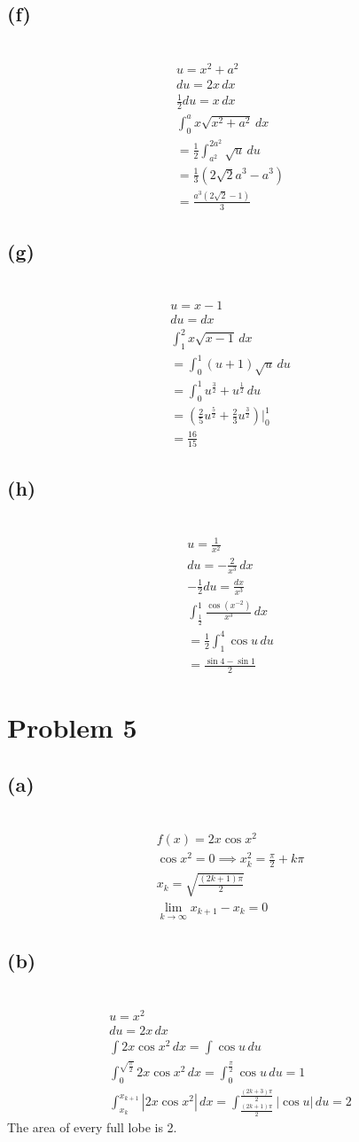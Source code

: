 \documentclass[12pt]{article}
\newcommand{\vem}{\vspace{0.5em}}
\newcommand{\problem}[1]{\section{Problem #1}}
\newcommand{\subproblem}[1]{\subsection{(#1)} \,}
\begin{document}
\subproblem{f}
\begin{gather*}
    u=x^2+a^2\\
    du=2x\, dx\\
    \frac{1}{2}du = x\, dx\\
    \int_0^a x\sqrt{x^2+a^2}\, dx\\
    =\frac{1}{2}\int_{a^2}^{2a^2} \sqrt{u}\, du\\
    =\frac{1}{3}(2\sqrt{2}a^3-a^3)\\
    =\boxed{\frac{a^3(2\sqrt{2}-1)}{3}}
\end{gather*}

\subproblem{g}
\begin{gather*}
    u=x-1\\
    du=dx\\
    \int_1^2x\sqrt{x-1}\, dx\\
    =\int_0^1 (u+1)\sqrt{u}\, du\\
    =\int_0^1 u^\frac{3}{2}+u^\frac{1}{2}\, du\\
    = (\frac{2}{5}u^\frac{5}{2}+ \frac{2}{3}u^\frac{3}{2})\Big|^1_0\\
    =\boxed{\frac{16}{15}}
\end{gather*}

\subproblem{h}
\begin{gather*}
    u=\frac{1}{x^2}\\
    du = -\frac{2}{x^3}\, dx\\
    -\frac{1}{2}du=\frac{dx}{x^3}\\
    \int_\frac{1}{2}^1\frac{\cos (x^{-2})}{x^3}\, dx\\
    =\frac{1}{2}\int_1^4 \cos u \, du\\
    =\boxed{\frac{\sin 4-\sin 1}{2}}
\end{gather*}

\problem{5}

\subproblem{a}
\begin{gather*}
    f(x)=2x\cos x^2\\
    \cos x^2=0 \implies x_k^2=\frac{\pi}{2}+k\pi\\
    x_k=\sqrt{\frac{(2k+1)\pi}{2}}\\
    \lim_{k\to \infty} x_{k+1}-x_k=0
\end{gather*}

\subproblem{b}
\begin{gather*}
    u=x^2\\
    du=2x \, dx\\
    \int 2x\cos x^2\, dx=\int \cos u\, du\\
    \int_0^{\sqrt{\frac{\pi}{2}}} 2x\cos x^2\, dx=\int_0^\frac{\pi}{2} \cos u\, du = 1\\
    \int_{x_k}^{x_{k+1}} |2x\cos x^2|\, dx = \int_{\frac{(2k+1)\pi}{2}}^{\frac{(2k+3)\pi}{2}} |\cos u|\, du = \boxed{2}
\end{gather*}
The area of every full lobe is 2.\vem
\end{document}
